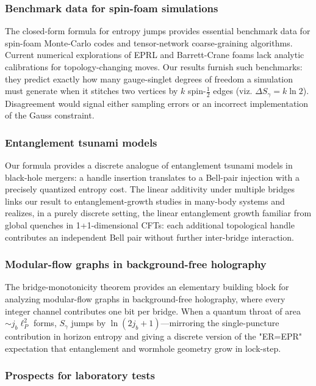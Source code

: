 \documentclass[11pt, a4paper]{article}
\theoremstyle{plain}
\theoremstyle{definition}
\theoremstyle{remark}
\begin{document}
\subsubsection{Benchmark data for spin-foam simulations}

The closed-form formula for entropy jumps provides essential benchmark data for spin-foam Monte-Carlo codes and tensor-network coarse-graining algorithms. Current numerical explorations of EPRL and Barrett-Crane foams \cite{ChircoOritiRaskin2018,CharlesLivine2016} lack analytic calibrations for topology-changing moves. Our results furnish such benchmarks: they predict exactly how many gauge-singlet degrees of freedom a simulation must generate when it stitches two vertices by $k$ spin-$\frac{1}{2}$ edges (viz. $\Delta S_{\gamma} = k\ln 2$). Disagreement would signal either sampling errors or an incorrect implementation of the Gauss constraint.

\subsubsection{Entanglement tsunami models}

Our formula provides a discrete analogue of entanglement tsunami models in black-hole mergers: a handle insertion translates to a Bell-pair injection with a precisely quantized entropy cost. The linear additivity under multiple bridges links our result to entanglement-growth studies in many-body systems \cite{AlbaCalabrese2017} and realizes, in a purely discrete setting, the linear entanglement growth familiar from global quenches in 1+1-dimensional CFTs: each additional topological handle contributes an independent Bell pair without further inter-bridge interaction.

\subsubsection{Modular-flow graphs in background-free holography}

The bridge-monotonicity theorem provides an elementary building block for analyzing modular-flow graphs in background-free holography, where every integer channel contributes one bit per bridge. When a quantum throat of area $\sim j_b\ell_P^2$ forms, $S_{\gamma}$ jumps by $\ln(2j_b+1)$—mirroring the single-puncture contribution in horizon entropy and giving a discrete version of the "ER=EPR" expectation that entanglement and wormhole geometry grow in lock-step.

\subsubsection{Prospects for laboratory tests}
\end{document}
